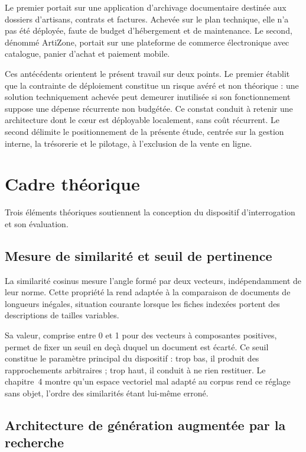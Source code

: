 Le premier portait sur une application d'archivage documentaire destinée aux dossiers d'artisans, contrats et factures. Achevée sur le plan technique, elle n'a pas été déployée, faute de budget d'hébergement et de maintenance. Le second, dénommé ArtiZone, portait sur une plateforme de commerce électronique avec catalogue, panier d'achat et paiement mobile.

Ces antécédents orientent le présent travail sur deux points. Le premier établit que la contrainte de déploiement constitue un risque avéré et non théorique : une solution techniquement achevée peut demeurer inutilisée si son fonctionnement suppose une dépense récurrente non budgétée. Ce constat conduit à retenir une architecture dont le cœur est déployable localement, sans coût récurrent. Le second délimite le positionnement de la présente étude, centrée sur la gestion interne, la trésorerie et le pilotage, à l'exclusion de la vente en ligne.

\section{Cadre théorique}
\label{sec:1-3}

Trois éléments théoriques soutiennent la conception du dispositif d'interrogation et son évaluation.

\subsection{Mesure de similarité et seuil de pertinence}

La similarité cosinus mesure l'angle formé par deux vecteurs, indépendamment de leur norme. Cette propriété la rend adaptée à la comparaison de documents de longueurs inégales, situation courante lorsque les fiches indexées portent des descriptions de tailles variables.

Sa valeur, comprise entre 0 et 1 pour des vecteurs à composantes positives, permet de fixer un seuil en deçà duquel un document est écarté. Ce seuil constitue le paramètre principal du dispositif : trop bas, il produit des rapprochements arbitraires ; trop haut, il conduit à ne rien restituer. Le chapitre~4 montre qu'un espace vectoriel mal adapté au corpus rend ce réglage sans objet, l'ordre des similarités étant lui-même erroné.

\subsection{Architecture de génération augmentée par la recherche}

